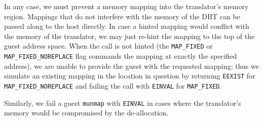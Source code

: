 \begin{description}
	In any case, we must prevent a memory mapping into the translator's memory region. %
	Mappings that do not interfere with the memory of the DBT can be passed along to the host directly.
	In case a hinted mapping would conflict with the memory of the translator, we may just re-hint the mapping to the top of the guest address space.
	When the call is not hinted (the \texttt{MAP\_FIXED} or \texttt{MAP\_FIXED\_NOREPLACE} flag commands the mapping at exactly the specified address), we are unable to provide the guest with the requested mapping;
	thus we simulate an existing mapping in the location in question by returning \texttt{EEXIST} for \texttt{MAP\_FIXED\_NOREPLACE} and failing the call with \texttt{EINVAL} for \texttt{MAP\_FIXED}.
	
	Similarly, we fail a guest \texttt{munmap} with \texttt{EINVAL} in cases where the translator's memory would be compromised by the de-allocation. %
\end{description}


